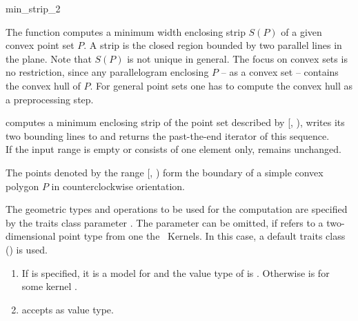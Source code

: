 \begin{ccRefFunction}{min_strip_2}
  
  \ccDefinition The function computes a minimum width enclosing strip
  $S(P)$ of a given convex point set $P$. A strip is the closed region
  bounded by two parallel lines in the plane. Note that $S(P)$ is not
  unique in general. The focus on convex sets is no restriction, since any
  parallelogram enclosing $P$ -- as a convex set -- contains the convex
  hull of $P$. For general point sets one has to compute the convex hull
  as a preprocessing step.


  \def\ccLongParamLayout{\ccTrue} 
  
  
  computes a minimum enclosing strip of the point set described by
  [, ), writes its two bounding lines
  to  and returns the past-the-end iterator of this sequence.\\
  If the input range is empty or consists of one element only, 
  remains unchanged.
  
  \ccPrecond The points denoted by the range [,
  ) form the boundary of a simple convex polygon $P$
  in counterclockwise orientation.

  The geometric types and operations to be used for the computation
  are specified by the traits class parameter . The parameter
  can be omitted, if  refers to a two-dimensional
  point type from one the \cgal\ Kernels. In this case, a default
  traits class () is
  used.
  
  \ccRequire
  \begin{enumerate}
  \item If  is specified, it is a model for
     and the value type  of
     is . Otherwise 
    is  for some kernel .
  \item {} accepts  as value type.
  \end{enumerate}
  

\end{ccRefFunction}
